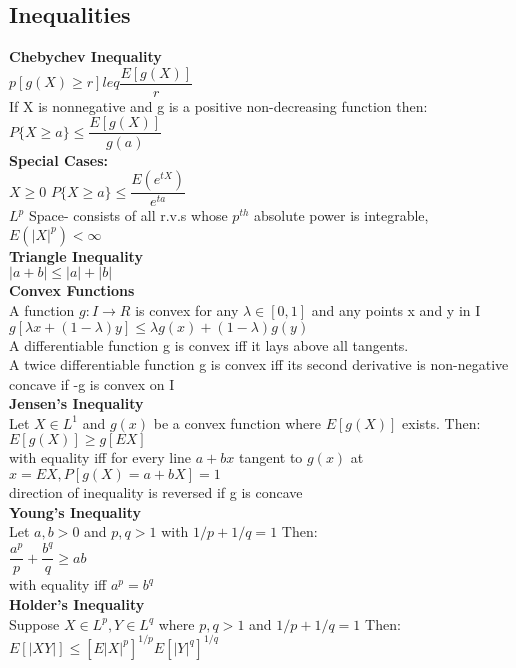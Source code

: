 \documentclass{article}
\begin{document}
\begin{flushleft}
\subsection*{Inequalities}
\textbf{Chebychev Inequality}\\
$p[g(X)\geq r]leq \dfrac{E[g(X)]}{r}$\\
If X is nonnegative and g is a positive non-decreasing function then:\\
$P\{X\geq a \}\leq \dfrac{E[g(X)]}{g(a)}$\\
\textbf{Special Cases:}\\
$X\geq 0$ \quad $P\{X\geq a \}\leq \dfrac{E(e^{tX})}{e^{ta}}$\\
$L^p$ Space- consists of all r.v.s whose $p^{th}$ absolute power is integrable, $E(|X|^p)<\infty$\\
\textbf{Triangle Inequality}\\
$|a+b|\leq |a|+|b|$\\
\textbf{Convex Functions}\\
A function $g: I\to R$ is convex for any $\lambda \in [0,1]$ and any points x and y in I\\
$g[\lambda x+(1-\lambda)y]\leq \lambda g(x)+(1-\lambda)g(y)$\\
A differentiable function g is convex iff it lays above all tangents.\\
A twice differentiable function g is convex iff its second derivative is non-negative\\
concave if -g is convex on I\\
\textbf{Jensen's Inequality}\\
Let $X \in L^1$ and $g(x)$ be a convex function where $E[g(X)]$ exists. Then:\\
$E[g(X)]\geq g[EX]$\\
with equality iff for every line $a+bx$ tangent to $g(x)$ at $x=EX, P[g(X)=a+bX]=1$\\
direction of inequality is reversed if g is concave\\
\textbf{Young's Inequality}\\
Let $a,b >0$ and $p,q>1$ with $1/p+1/q=1$ Then:\\
$\dfrac{a^p}{p}+\dfrac{b^q}{q}\geq ab$\\
with equality iff $a^p=b^q$\\
\textbf{Holder's Inequality}\\
Suppose $X \in L^p, Y \in L^q$ where $p,q>1$ and $1/p+1/q=1$ Then:\\
$E[|XY|]\leq [E|X|^p]^{1/p}E[|Y|^q]^{1/q}$\\

\end{flushleft}
\end{document}
